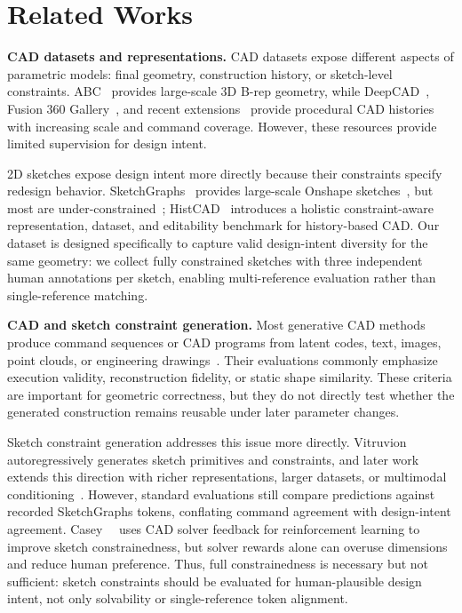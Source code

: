 \section{Related Works}
\label{sec:related_works}

\textbf{CAD datasets and representations.}
CAD datasets expose different aspects of parametric models: final geometry, construction history, or sketch-level constraints. ABC~\cite{Koch_2019_CVPR} provides large-scale 3D B-rep geometry, while DeepCAD~\cite{Wu_2021_ICCV}, Fusion 360 Gallery~\cite{willis2020fusion}, and recent extensions~\cite{rukhovich2025cad,fan2025history,lin2026unisketch,elistratov2026cadevolve} provide procedural CAD histories with increasing scale and command coverage. However, these resources provide limited supervision for design intent.

2D sketches expose design intent more directly because their constraints specify redesign behavior. SketchGraphs~\cite{seff2020sketchgraphs} provides large-scale Onshape sketches~\cite{onshape2026}, but most are under-constrained~\cite{casey2025aligning}; HistCAD~\cite{dong2025histcad} introduces a holistic constraint-aware representation, dataset, and editability benchmark for history-based CAD. Our dataset is designed specifically to capture valid design-intent diversity for the same geometry: we collect fully constrained sketches with three independent human annotations per sketch, enabling multi-reference evaluation rather than single-reference matching.

\textbf{CAD and sketch constraint generation.}
Most generative CAD methods produce command sequences or CAD programs from latent codes, text, images, point clouds, or engineering drawings~\cite{Wu_2021_ICCV,xu2022skexgen,xu2023hierarchical,khan2024cad,chen2025cadcrafter,rukhovich2025cad,kolodiazhnyi2025cadrille,li2025seek,elistratov2026cadevolve}. Their evaluations commonly emphasize execution validity, reconstruction fidelity, or static shape similarity. These criteria are important for geometric correctness, but they do not directly test whether the generated construction remains reusable under later parameter changes.

Sketch constraint generation addresses this issue more directly. Vitruvion~\cite{seff2021vitruvion} autoregressively generates sketch primitives and constraints, and later work extends this direction with richer representations, larger datasets, or multimodal conditioning~\cite{willis2021engineering,karadeniz2024davinci,wu2024cadvlm,mallis2025cad,lin2026unisketch,karadenizMiCADangelo}. However, standard evaluations still compare predictions against recorded SketchGraphs tokens, conflating command agreement with design-intent agreement. Casey~\etal~\cite{casey2025aligning} uses CAD solver feedback for reinforcement learning to improve sketch constrainedness, but solver rewards alone can overuse dimensions and reduce human preference. Thus, full constrainedness is necessary but not sufficient: sketch constraints should be evaluated for human-plausible design intent, not only solvability or single-reference token alignment.

